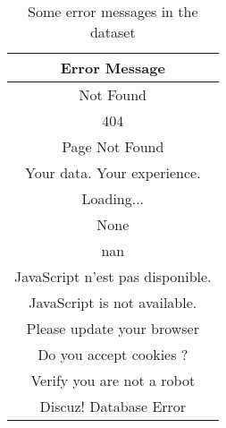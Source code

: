 \begin{table}[ht]
\centering
\begin{tabular}{|c|}

\hline
\textbf{Error Message}\\ \hline
Not Found \\
404 \\
Page Not Found \\
Your data. Your experience. \\
Loading... \\
None \\
nan \\
JavaScript n'est pas disponible. \\
JavaScript is not available. \\
Please update your browser \\
Do you accept cookies ?\\
Verify you are not a robot\\
Discuz! Database Error\\
\hline
\end{tabular}
\caption{Some error messages in the \VSI{} dataset}
\label{tab:04_error_messages}
\end{table}